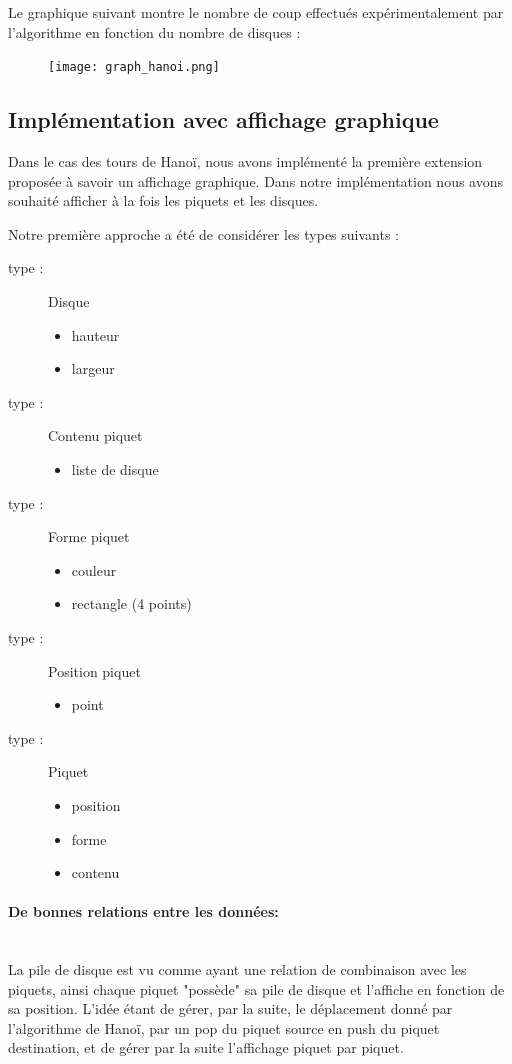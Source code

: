 \documentclass[a4paper,11pt]{article}
\begin{document}
Le graphique suivant montre le nombre de coup effectués expérimentalement par l'algorithme en fonction du nombre de disques :
\begin{figure}[h]
  \texttt{[image: graph\_hanoi.png]}
  \label{fig:graph_hanoi}
\end{figure}

\subsection{Implémentation avec affichage graphique}
Dans le cas des tours de Hanoï, nous avons implémenté la première extension proposée à savoir un affichage graphique.
Dans notre implémentation nous avons souhaité afficher à la fois les piquets et les disques.

Notre première approche a été de considérer les types suivants :
\begin{multicols}{3}
\begin{description}
\item[type :] Disque 
	\begin{itemize}
	\item hauteur
	\item largeur 
	\end{itemize}
\item[type :] Contenu piquet
	\begin{itemize}
	\item liste de disque
	\end{itemize}
\item[type :] Forme piquet
	\begin{itemize}
	\item couleur
	\item rectangle (4 points) 
	\end{itemize}
\item[type :]Position piquet
	\begin{itemize}
	\item point 
	\end{itemize}
\item [type :] Piquet 
	\begin{itemize}
	\item position
	\item forme
	\item contenu 
	\end{itemize}
\end{description}
\end{multicols}
\paragraph{De bonnes relations entre les données:}\mbox{}\\
La pile de disque est vu comme ayant une relation de combinaison avec les piquets, ainsi chaque piquet "possède" sa pile de disque et l'affiche en fonction de sa position.
L'idée étant de gérer, par la suite, le déplacement donné par l'algorithme de Hanoï, par un pop du piquet source en push du piquet destination, et de gérer par la suite l'affichage piquet par piquet. 
\end{document}
